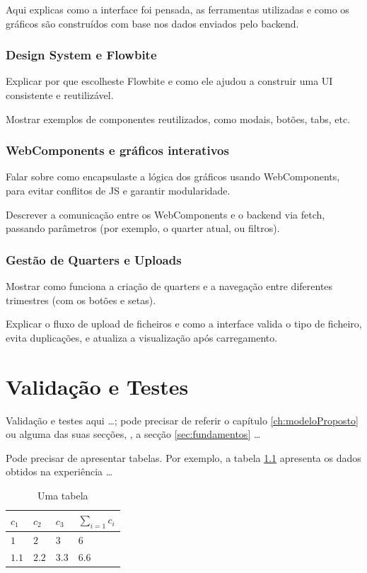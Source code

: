Aqui explicas como a interface foi pensada, as ferramentas utilizadas e como os gráficos são construídos com base nos dados enviados pelo backend.
\subsection{Design System e Flowbite}

    Explicar por que escolheste Flowbite e como ele ajudou a construir uma UI consistente e reutilizável.

    Mostrar exemplos de componentes reutilizados, como modais, botões, tabs, etc.

\subsection{WebComponents e gráficos interativos}

    Falar sobre como encapsulaste a lógica dos gráficos usando WebComponents, para evitar conflitos de JS e garantir modularidade.

    Descrever a comunicação entre os WebComponents e o backend via fetch, passando parâmetros (por exemplo, o quarter atual, ou filtros).

\subsection{Gestão de Quarters e Uploads}

    Mostrar como funciona a criação de quarters e a navegação entre diferentes trimestres (com os botões e setas).

    Explicar o fluxo de upload de ficheiros e como a interface valida o tipo de ficheiro, evita duplicações, e atualiza a visualização após carregamento.

\chapter{Validação e Testes}
\label{ch:validacaoTestes}

Validação e testes aqui \ldots; pode precisar de referir o capítulo \ref{ch:modeloProposto} ou alguma das suas secções, \eg, a secção \ref{sec:fundamentos} \ldots

Pode precisar de apresentar tabelas. Por exemplo, a tabela \ref{tab:umaTabela} apresenta os dados obtidos na experiência \ldots
\begin{table}[h]
   \centering
   \begin{tabular}{l|l|l|l}
      $c_1$ & $c_2$ & $c_3$ & $\sum_{i=1} c_i$
      \\
      \hline \hline
      $1$ & $2$ & $3$ & $6$
      \\ \hline
      $1.1$ & $2.2$ & $3.3$ & $6.6$
      \\
      \hline \hline
   \end{tabular}
\caption{Uma tabela}
\label{tab:umaTabela}
\end{table}

